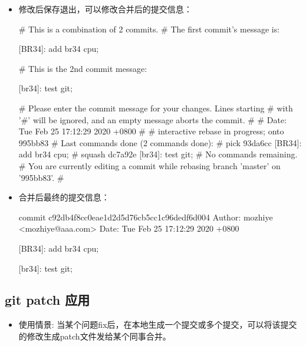 \begin{itemize}
\item 修改后保存退出，可以修改合并后的提交信息：
\begin{messagebox}
# This is a combination of 2 commits.
# The first commit's message is:

[BR34]: add br34 cpu;

# This is the 2nd commit message:

[br34]: test git;

# Please enter the commit message for your changes. Lines starting
# with '#' will be ignored, and an empty message aborts the commit.
#
# Date:      Tue Feb 25 17:12:29 2020 +0800
#
# interactive rebase in progress; onto 995bb83
# Last commands done (2 commands done):
#    pick 93da6cc [BR34]: add br34 cpu;
#    squash dc7a92e [br34]: test git;
# No commands remaining.
# You are currently editing a commit while rebasing branch 'master' on '995bb83'.
#
\end{messagebox}

\item 合并后最终的提交信息：
\begin{messagebox}
commit c92db4f8cc0eae1d2d5d76cb5cc1c96dedf6d004
Author: mozhiye <mozhiye@aaa.com>
Date:   Tue Feb 25 17:12:29 2020 +0800

    [BR34]: add br34 cpu;
        
    [br34]: test git;
\end{messagebox}

\end{itemize}


\subsection{git patch 应用}
\begin{itemize}
\item 使用情景: 当某个问题fix后，在本地生成一个提交或多个提交，可以将该提交的修改生成patch文件发给某个同事合并。
\end{itemize}

